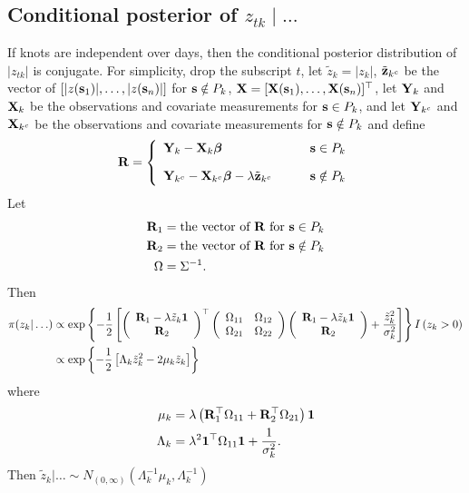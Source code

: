 \subsection*{Conditional posterior of $z_{tk} \mid \ldots $}\label{sts:mvcondu}
If knots are independent over days, then the conditional posterior distribution of $|z_{tk}|$ is conjugate.
For simplicity, drop the subscript $t$, let $\tilde{z}_{k} = |z_{k}|$, $\tilde{\mathbf{z}}_{k^c}$ be the vector of $[|z(\mathbf{s}_1)|, \ldots, |z(\mathbf{s}_n)|]$ for $\mathbf{s} \notin P_k$, $\mathbf{X} = [\mathbf{X}(\mathbf{s}_1), \ldots, \mathbf{X}(\mathbf{s}_n)]^\top$, let $\mathbf{Y}_k$ and $\mathbf{X}_k$ be the observations and covariate measurements for $\mathbf{s} \in P_k$, and let $\mathbf{Y}_{k^c}$ and $\mathbf{X}_{k^c}$ be the observations and covariate measurements for $\mathbf{s} \notin P_k$ and define
\begin{align*}
\mathbf{R} = \left\{
    \begin{array}{ll}
        \mathbf{Y}_k - \mathbf{X}_k \mbox{\boldmath $\beta$} & \mathbf{s} \in P_k\\[1em]
        \mathbf{Y}_{k^c} - \mathbf{X}_{k^c} \mbox{\boldmath $\beta$} - \lambda \tilde{\mathbf{z}}_{k^c} \qquad & \mathbf{s} \notin P_k
    \end{array}
\right.
\end{align*}
Let
\begin{align*}
    \mathbf{R}_1 &= \text{the vector of } \mathbf{R} \text{ for } \mathbf{s} \in P_k \\
    \mathbf{R}_2 &= \text{the vector of } \mathbf{R} \text{ for } \mathbf{s} \notin P_k \\
    \Omega &= \Sigma^{-1}.
\end{align*}
Then
\begin{align*}
    \pi(z_k | \ldots) &\propto \exp \left\{ -\frac{ 1 }{ 2 } \left[
        \left( \begin{array}{c}
            \mathbf{R}_1 - \lambda \tilde{z}_k \mathbf{1}\\
            \mathbf{R}_2
        \end{array} \right)^\top
        \left( \begin{array}{cc}
            \Omega_{11} & \Omega_{12}\\
            \Omega_{21} & \Omega_{22}
        \end{array} \right)
        \left( \begin{array}{c}
            \mathbf{R}_1 - \lambda \tilde{z}_k \mathbf{1}\\
            \mathbf{R}_2
        \end{array} \right)
        +  \frac{ {\tilde{z}_k}^2 }{ \sigma_k^2 }\right]
    \right\} I \left(z_k > 0 \right) \\
        &\propto \exp \left\{ -\frac{ 1 }{ 2 } \left[ \Lambda_k {\tilde{z}_k}^2 - 2 \mu_k \tilde{z}_k \right] \right\}
\end{align*}
where
\begin{align*}
    \mu_k &= \lambda \left( \mathbf{R}_1^\top \Omega_{11} + \mathbf{R}_2^\top \Omega_{21} \right)\mathbf{1}\\
    \Lambda_k &= \lambda^2 \mathbf{1}^\top \Omega_{11} \mathbf{1} + \frac{ 1 }{ \sigma^2_k }.
\end{align*}
Then $\tilde{z}_k | \ldots \sim N_{(0, \infty)} \left(\Lambda_k^{-1} \mu_k, \Lambda_k^{-1} \right)$

